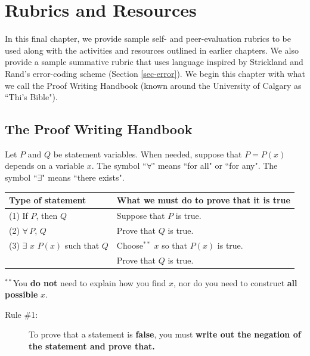 \documentclass[12pt]{book}
\begin{document}
\chapter{Rubrics and Resources}\label{ch-rubrics}

In this final chapter, we provide sample self- and peer-evaluation rubrics to be used along with the activities and resources outlined in earlier chapters. We also provide a sample summative rubric that uses language inspired by Strickland and Rand's error-coding scheme (Section \ref{sec-error}).  We begin this chapter with what we call the Proof Writing Handbook (known around the University of Calgary as ``Thi's Bible").

\clearpage

\section{The Proof Writing Handbook}\label{sec-handbook}
Let $P$ and $Q$ be statement variables. When needed, suppose that $P=P(x)$ depends on a variable $x$.   The symbol ``$\forall$" means ``for all" or ``for any".  The symbol ``$\exists$" means ``there exists".
\begin{center}
\begin{tabular}{l|l}
\textbf{Type of statement} & \textbf{What we must do to prove that it is true}\\
\hline
(1) If $P$, then $Q$ & Suppose that $P$ is true. \\
(2) $\forall\, P$, $Q$ & \quad Prove that $Q$ is true. \\
\hline 
(3) $\exists$ $x$ $P(x)$ such that $Q$ & Choose${}^{**}$ $x$ so that $P(x)$ is true. \\
 & \quad Prove that $Q$ is true.\\	
\end{tabular}
\end{center}
${}^{**}$You \textbf{do not} need to explain how you find $x$, nor do you need to construct \textbf{all possible} $x$.
\begin{description}
\item[Rule \#1:] To prove that a statement is \textbf{false}, you must \textbf{write out the negation of the statement and prove that.}
\end{description}
\end{document}
